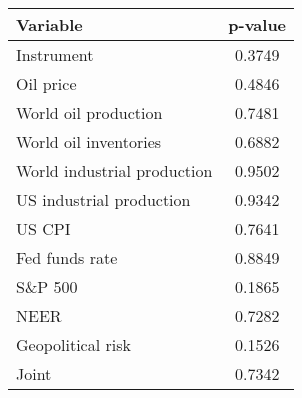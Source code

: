 \begin{tabular}{lc}\toprule\midrule 
 Variable & p-value  \\  \midrule 
Instrument & 0.3749  \\ 
Oil price & 0.4846  \\ 
World oil production & 0.7481  \\ 
World oil inventories & 0.6882  \\ 
World industrial production & 0.9502  \\ 
US industrial production & 0.9342  \\ 
US CPI & 0.7641  \\ 
Fed funds rate & 0.8849  \\ 
S\&P 500 & 0.1865  \\ 
NEER & 0.7282  \\ 
Geopolitical risk & 0.1526  \\ 
Joint & 0.7342  \\ 
\midrule\bottomrule 
\end{tabular} 
